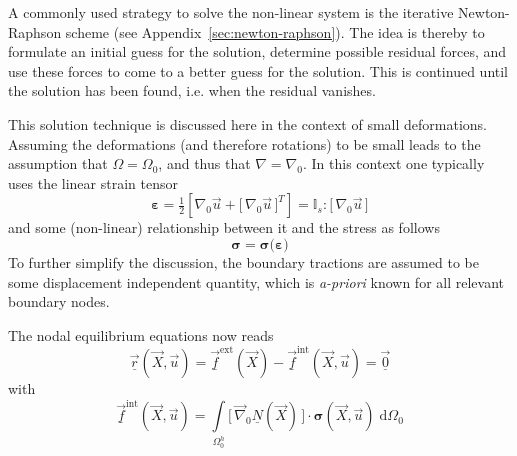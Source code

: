 \documentclass[times,namecite]{goose-article}
\begin{document}
A commonly used strategy to solve the non-linear system is the iterative Newton-Raphson scheme (see Appendix~\ref{sec:newton-raphson}). The idea is thereby to formulate an initial guess for the solution, determine possible residual forces, and use these forces to come to a better guess for the solution. This is continued until the solution has been found, i.e. when the residual vanishes.

This solution technique is discussed here in the context of small deformations. Assuming the deformations (and therefore rotations) to be small leads to the assumption that $\Omega = \Omega_0$, and thus that $\nabla = \nabla_0$. In this context one typically uses the linear strain tensor
\begin{equation}
  \bm{\varepsilon}
  =
  \tfrac{1}{2} \left[ \nabla_0 \vec{u} + \big[\, \nabla_0 \vec{u} \,\big]^T \right]
  =
  \mathbb{I}_s : \big[\, \nabla_0 \vec{u} \,\big]
\end{equation}
and some (non-linear) relationship between it and the stress as follows
\begin{equation}
  \bm{\sigma} = \bm{\sigma} \big( \bm{\varepsilon} \big)
\end{equation}
To further simplify the discussion, the boundary tractions are assumed to be some displacement independent quantity, which is \textit{a-priori} known for all relevant boundary nodes.

The nodal equilibrium equations now reads
\begin{equation}
\label{eq:static:eq-non-lin}
  \underline{\vec{r}}(\vec{X}, \vec{u})
  =
  \underline{\vec{f}}^\mathrm{ext}(\vec{X})
  -
  \underline{\vec{f}}^\mathrm{int}(\vec{X}, \vec{u})
  =
  \underline{\vec{0}}
\end{equation}
with
\begin{equation}
  \underline{\vec{f}}^\mathrm{int}(\vec{X}, \vec{u})
  =
  \int\limits_{\Omega^h_0}
    \big[\, \vec{\nabla}_0 \underline{N}(\vec{X}) \,\big]
    \cdot
    \bm{\sigma}(\vec{X}, \vec{u}) \;
  \mathrm{d}\Omega_0
\end{equation}
\end{document}
